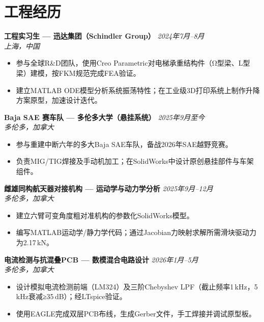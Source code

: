 \documentclass[a4paper,10pt]{article}
\newcommand{\entry}[2]{\textbf{#1} \hfill \textit{#2}}
\newcommand{\subline}[1]{\textit{\small #1}}
\begin{document}
\section{工程经历}

\entry{工程实习生 — 迅达集团（Schindler Group）}{2024年7月--8月}\\
\subline{上海，中国}
\begin{itemize}
  \item 参与全球R\&D团队，使用Creo Parametric对电梯承重结构件（Ω型梁、L型梁）建模，按FKM规范完成FEA验证。
  \item 建立MATLAB ODE模型分析系统振荡特性；在工业级3D打印系统上制作升降方案原型，加速设计迭代。
\end{itemize}

\vspace{2pt}
\entry{Baja SAE 赛车队 — 多伦多大学（悬挂系统）}{2025年9月至今}\\
\subline{多伦多，加拿大}
\begin{itemize}
  \item 参与重建中断六年的多大Baja SAE车队，备战2026年SAE越野竞赛。
  \item 负责MIG/TIG焊接及手动机加工；在SolidWorks中设计原创悬挂部件与车架组件。
\end{itemize}

\vspace{2pt}
\entry{雌雄同构航天器对接机构 — 运动学与动力学分析}{2025年9月--12月}\\
\subline{多伦多，加拿大}
\begin{itemize}
  \item 建立六臂可变角度粗对准机构的参数化SolidWorks模型。
  \item 编写MATLAB运动学/静力学代码；通过Jacobian力映射求解所需滑块驱动力为2.17\,kN。
\end{itemize}

\vspace{2pt}
\entry{电流检测与抗混叠PCB — 数模混合电路设计}{2026年1月--5月}\\
\subline{多伦多，加拿大}
\begin{itemize}
  \item 设计模拟电流检测前端（LM324）及三阶Chebyshev LPF（截止频率1\,kHz，5\,kHz衰减≥35\,dB）；经LTspice验证。
  \item 使用EAGLE完成双层PCB布线，生成Gerber文件，手工焊接并调试原型板。
\end{itemize}
\end{document}
